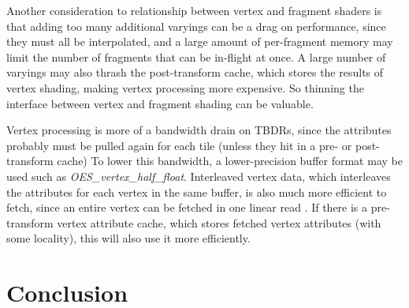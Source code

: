 Another consideration to relationship between vertex and fragment shaders is
that adding too many additional varyings can be a drag on performance, since
they must all be interpolated, and a large amount of per-fragment memory may
limit the number of fragments that can be in-flight at once.  A large number of
varyings may also thrash the post-transform cache, which stores the results of
vertex shading, making vertex processing more expensive.  So thinning the
interface between vertex and fragment shading can be valuable.

Vertex processing is more of a bandwidth drain on TBDRs, since the attributes probably must be pulled again for each tile (unless they hit in a pre- or post- transform cache)  To lower this bandwidth, a lower-precision buffer format may be used such as \textit{OES\_vertex\_half\_float}.  Interleaved vertex data, which interleaves the attributes for each vertex in the same buffer, is also much more efficient to fetch, since an entire vertex can be fetched in one linear read \cite{apple_vertex}.  If there is a pre-transform vertex attribute cache, which stores fetched vertex attributes (with some locality), this will also use it more efficiently.  

\section{Conclusion}\label{Jon-McCaffrey-Conclusion}















